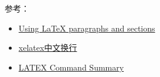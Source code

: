 \documentclass[12pt]{article}
\begin{document}
参考：

\begin{itemize}
\tightlist
\item
  \href{https://www.latex-tutorial.com/tutorials/sections/}{Using LaTeX paragraphs and sections}
\item
  \href{http://yakeworld.myesci.com/node/1397}{xelatex中文换行}
\item
  \href{https://www.ntg.nl/doc/biemesderfer/ltxcrib.pdf}{LATEX Command Summary}
\end{itemize}
\end{document}
